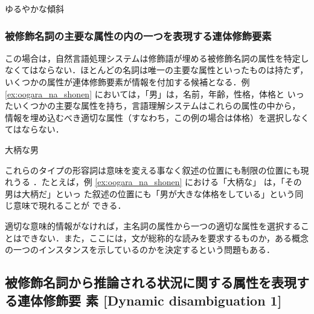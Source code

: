 \begin{exx}\rm
  \label{ex:yuruyaka_na_keisya}
  \hspace*{.5cm} ゆるやかな傾斜

\vspace*{3mm}

  \begin{center}
  \end{center}
\end{exx}

\subsubsection{被修飾名詞の主要な属性の内の一つを表現する連体修飾要素}

この場合は，自然言語処理システムは修飾語が埋める被修飾名詞の属性を特定し
なくてはならない．ほとんどの名詞は唯一の主要な属性といったものは持たず，
いくつかの属性が連体修飾要素が情報を付加する候補となる．例 
\ref{ex:oogara_na_shonen} においては，「男」は，名前，年齢，性格，体格と
いったいくつかの主要な属性を持ち，言語理解システムはこれらの属性の中から，
情報を埋め込むべき適切な属性（すなわち，この例の場合は体格）を選択しなく
てはならない． 

\begin{exx}\rm
  \label{ex:oogara_na_shonen}
  \hspace*{.5cm} 大柄な男

\vspace*{3mm}

  \begin{center}
  \end{center}
\end{exx}

これらのタイプの形容詞は意味を変える事なく叙述の位置にも制限の位置にも現
れうる \cite{Sakuma67j,Teramura91j,Hashimoto92j} ．たとえば，例 
\ref{ex:oogara_na_shonen} における「大柄な」 は，「その男は大柄だ」といっ
た叙述の位置にも「男が大きな体格をしている」という同じ意味で現れることが
できる． 

適切な意味的情報がなければ，主名詞の属性から一つの適切な属性を選択するこ
とはできない．また，ここには，文が総称的な読みを要求するものか，ある概念
の一つのインスタンスを示しているのかを決定するという問題もある．

\subsection{被修飾名詞から推論される状況に関する属性を表現する連体修飾要
素 [Dynamic disambiguation 1] }
\label{sec:Dynamic_disambigation1}

